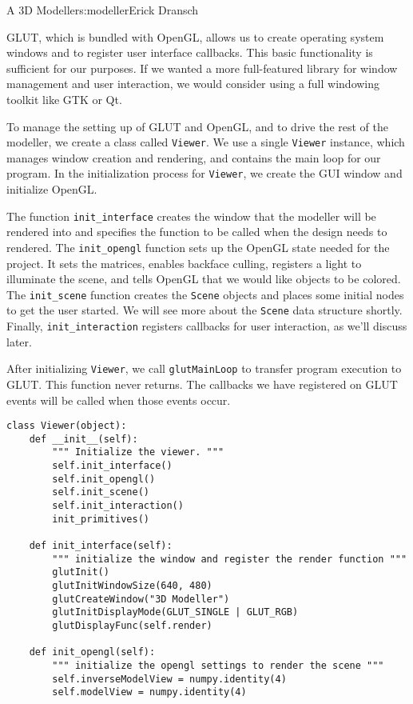 \begin{aosachapter}{A 3D Modeller}{s:modeller}{Erick Dransch}
\label{about-glut}

GLUT, which is bundled with OpenGL, allows us to create operating system
windows and to register user interface callbacks. This basic
functionality is sufficient for our purposes. If we wanted a more
full-featured library for window management and user interaction, we
would consider using a full windowing toolkit like GTK or Qt.

\label{the-viewer}

To manage the setting up of GLUT and OpenGL, and to drive the rest of
the modeller, we create a class called \texttt{Viewer}. We use a single
\texttt{Viewer} instance, which manages window creation and rendering,
and contains the main loop for our program. In the initialization
process for \texttt{Viewer}, we create the GUI window and initialize
OpenGL.

The function \texttt{init\_interface} creates the window that the
modeller will be rendered into and specifies the function to be called
when the design needs to rendered. The \texttt{init\_opengl} function
sets up the OpenGL state needed for the project. It sets the matrices,
enables backface culling, registers a light to illuminate the scene, and
tells OpenGL that we would like objects to be colored. The
\texttt{init\_scene} function creates the \texttt{Scene} objects and
places some initial nodes to get the user started. We will see more
about the \texttt{Scene} data structure shortly. Finally,
\texttt{init\_interaction} registers callbacks for user interaction, as
we'll discuss later.

After initializing \texttt{Viewer}, we call \texttt{glutMainLoop} to
transfer program execution to GLUT. This function never returns. The
callbacks we have registered on GLUT events will be called when those
events occur.

\begin{verbatim}
class Viewer(object):
    def __init__(self):
        """ Initialize the viewer. """
        self.init_interface()
        self.init_opengl()
        self.init_scene()
        self.init_interaction()
        init_primitives()

    def init_interface(self):
        """ initialize the window and register the render function """
        glutInit()
        glutInitWindowSize(640, 480)
        glutCreateWindow("3D Modeller")
        glutInitDisplayMode(GLUT_SINGLE | GLUT_RGB)
        glutDisplayFunc(self.render)

    def init_opengl(self):
        """ initialize the opengl settings to render the scene """
        self.inverseModelView = numpy.identity(4)
        self.modelView = numpy.identity(4)


\end{verbatim}
\end{aosachapter}
